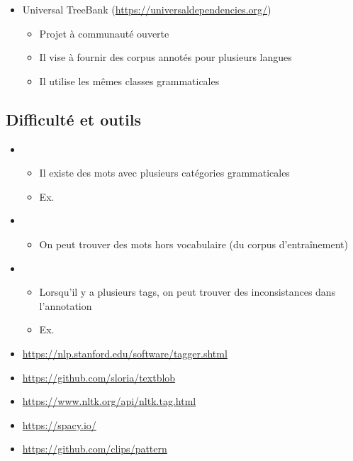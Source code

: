 \documentclass{KodeBook}
\begin{document}
\begin{itemize}
	\item Universal TreeBank (\url{https://universaldependencies.org/}) \cite{2012-petrov-al}
	\begin{itemize}
		\item Projet à communauté ouverte
		\item Il vise à fournir des corpus annotés pour plusieurs langues
		\item Il utilise les mêmes classes grammaticales
	\end{itemize}
\end{itemize}

\subsection{Difficulté et outils}

\begin{itemize}
	\item {}
	\begin{itemize}
		\item Il existe des mots avec plusieurs catégories grammaticales
		\item Ex. 
	\end{itemize}
	\item {}
	\begin{itemize}
		\item On peut trouver des mots hors vocabulaire (du corpus d'entraînement)
	\end{itemize}
	\item {} 
	\begin{itemize}
		\item Lorsqu'il y a plusieurs tags, on peut trouver des inconsistances dans l'annotation
		\item Ex. 
	\end{itemize}
\end{itemize}

\begin{itemize}
	\item \url{https://nlp.stanford.edu/software/tagger.shtml}
	\item \url{https://github.com/sloria/textblob}
	\item \url{https://www.nltk.org/api/nltk.tag.html}
	\item \url{https://spacy.io/}
	\item \url{https://github.com/clips/pattern}
\end{itemize}
\end{document}
